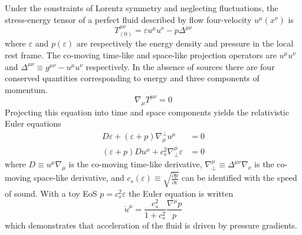 Under the constraints of Lorentz symmetry and neglecting fluctuations, the stress-energy tensor of a perfect fluid described by flow four-velocity $u^\mu(x^\nu)$ is
\begin{equation}
T^{\mu\nu}_{(0)} = \varepsilon u^\mu u^\nu - p \Delta^{\mu\nu}
\end{equation}
where $\varepsilon$ and $p(\varepsilon)$ are respectively the energy density and pressure in the local rest frame.
The co-moving time-like and space-like projection operators are $u^\mu u^\nu$ and \( \Delta^{\mu\nu} \equiv g^{\mu\nu} - u^\mu u^\nu \) respectively.
In the absence of sources there are four conserved quantities corresponding to energy and three components of momentum.
\begin{equation}
  \label{eq:em_cons}
  \nabla_\mu T^{\mu\nu} = 0
\end{equation}
Projecting this equation into time and space components yields the relativistic Euler equations
\begin{align}
  D\varepsilon + \left(\varepsilon + p\right)\nabla^\perp_\mu u^\mu &= 0 \\
  \left(\varepsilon + p\right)Du^\mu + c_s^2 \nabla_\perp^\mu \varepsilon &= 0 
\end{align}
where \(D \equiv u^\mu \nabla_\mu\) is the co-moving time-like derivative, \( \nabla_\perp^\mu \equiv \Delta^{\mu\nu} \nabla_\nu \) is the co-moving space-like derivative, and \(c_s(\varepsilon) \equiv \sqrt{\frac{\partial p}{\partial \varepsilon}} \) can be identified with the speed of sound.
With a toy \ac{EoS} $p = c_s^2 \varepsilon$ the Euler equation is written %
\begin{equation}
\dot{u}^\mu = \frac{c_s^2}{1+c_s^2} \frac{\nabla^\mu p}{p}
\end{equation}
which demonstrates that acceleration of the fluid is driven by pressure gradients.

